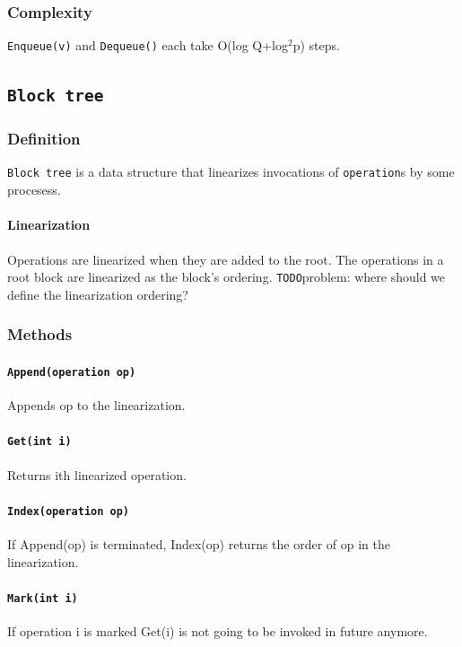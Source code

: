 \documentclass[12pt]{article}
\begin{document}
\subsubsection{Complexity} \texttt{Enqueue(v)} and \texttt{Dequeue()} each take O(log Q+log$^{2}$p) steps.


\subsection{\texttt{‌Block tree}}
\subsubsection{Definition}
\texttt{Block tree} is a data structure that linearizes invocations of \texttt{operation}s by some procesess. \paragraph{Linearization} Operations are linearized when they are added to the root. The operations in a root block are linearized as the block's ordering.
\texttt{TODO}{problem: where should we define the linearization ordering?}
\subsubsection{Methods}
\paragraph{\texttt{Append(operation op)}}
Appends op to the linearization.
\paragraph{\texttt{Get(int i)}}
Returns ith linearized operation.
\paragraph{\texttt{Index(operation op)}}
If Append(op) is terminated, Index(op) returns the order of op in the linearization.
\paragraph{\texttt{Mark(int i)}} If operation i is marked Get(i) is not going to be invoked in future anymore.
\end{document}
